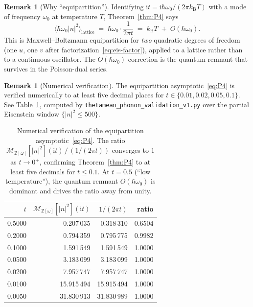 \documentclass[11pt,letterpaper]{article}
\theoremstyle{plain}
\theoremstyle{definition}
\newtheorem{remark}[theorem]{Remark}
\newcommand{\Eisenstein}{\mathbb{Z}[\omega]}
\newcommand{\tmeaneis}[1]{\mathcal{M}_{\Eisenstein}[#1]}
\begin{document}
\begin{remark}[Why ``equipartition'']
Identifying $\mathrm{i} t = \mathrm{i}\hbar\omega_0/(2\pi k_{\mathrm{B}} T)$
with a mode of frequency $\omega_0$ at temperature $T$,
Theorem~\ref{thm:P4} says
\[
  \langle \hbar\omega_0|n|^2\rangle_{\mathrm{lattice}}
  \;=\; \hbar\omega_0 \cdot \frac{1}{2\pi t}
  \;=\; k_{\mathrm{B}} T \;+\; O(\hbar\omega_0).
\]
This is Maxwell--Boltzmann equipartition for \emph{two} quadratic
degrees of freedom (one $u$, one $v$ after
factorization~\eqref{eq:eis-factor}), applied to a lattice rather
than to a continuous oscillator.  The $O(\hbar\omega_0)$ correction
is the quantum remnant that survives in the Poisson-dual series.
\end{remark}

\begin{remark}[Numerical verification]\label{rem:numerics}
The equipartition asymptotic~\eqref{eq:P4} is verified numerically
to at least five decimal places for $t\in\{0.01, 0.02, 0.05, 0.1\}$.
See Table~\ref{tab:equip-numerical}, computed by
\texttt{thetamean\_phonon\_validation\_v1.py} over the partial
Eisenstein window $\{|n|^2\le 500\}$.
\begin{table}[ht]
\centering
\begin{tabular}{rrrr}
\toprule
$t$ & $\tmeaneis{|n|^2}(\mathrm{i} t)$ & $1/(2\pi t)$ & ratio\\
\midrule
0.5000 & 0.207\,035 & 0.318\,310 & 0.6504 \\
0.2000 & 0.794\,359 & 0.795\,775 & 0.9982 \\
0.1000 & 1.591\,549 & 1.591\,549 & 1.0000 \\
0.0500 & 3.183\,099 & 3.183\,099 & 1.0000 \\
0.0200 & 7.957\,747 & 7.957\,747 & 1.0000 \\
0.0100 & 15.915\,494 & 15.915\,494 & 1.0000 \\
0.0050 & 31.830\,913 & 31.830\,989 & 1.0000 \\
\bottomrule
\end{tabular}
\caption{Numerical verification of the equipartition
asymptotic~\eqref{eq:P4}.  The ratio
$\tmeaneis{|n|^2}(\mathrm{i} t)\,/\,(1/(2\pi t))$ converges to $1$
as $t\to 0^+$, confirming Theorem~\ref{thm:P4} to at least five
decimals for $t\le 0.1$.  At $t=0.5$ (``low temperature''), the
quantum remnant $O(\hbar\omega_0)$ is dominant and drives the ratio
away from unity.}\label{tab:equip-numerical}
\end{table}
\end{remark}
\end{document}

